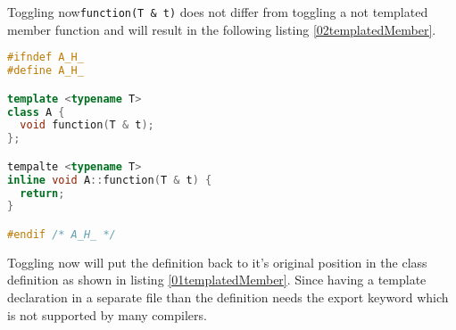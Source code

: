 Toggling now\texttt{function(T \& t)} does not differ from toggling a not
templated member function and will result in the following listing
\ref{02templatedMember}.

\begin{lstlisting}[caption={A.h, in header definition with template parameters},
label={02templatedMember}, language=C++]
#ifndef A_H_
#define A_H_

template <typename T>
class A {
  void function(T & t);
};

tempalte <typename T>
inline void A::function(T & t) {
  return;
}

#endif /* A_H_ */
\end{lstlisting}

Toggling now will put the definition back to it's original position in the
class definition as shown in listing \ref{01templatedMember}. Since having a
template declaration in a separate file than the definition needs the export
keyword which is not supported by many compilers.